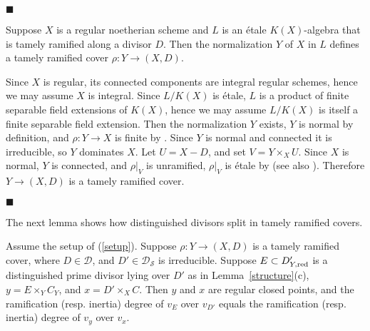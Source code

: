 \documentclass{amsart}
\theoremstyle{plain}
\theoremstyle{definition}
\theoremstyle{remark}
\numberwithin{equation}{section}%
\renewcommand{\S}{{\mathcal S}}
\renewcommand{\div}{{\text{\rm div}}}
\newcommand{\red}{{\text{\rm red}}}
\newcommand{\Pf}{{\noindent{\it Proof.}\;\;}}
\begin{document}



\hfill $\blacksquare$



\Lemma\label{covers}
Suppose $X$ is a regular noetherian scheme and
$L$ is an \'etale $K(X)$-algebra that is tamely ramified along a divisor $D$.
Then the normalization $Y$ of $X$ in $L$ defines a tamely ramified cover
$\rho:Y\to(X,D)$.
\rm

\Pf
Since $X$ is regular, its connected components are integral regular schemes, 
hence we may assume $X$ is integral.
Since $L/K(X)$ is \'etale, $L$ is a product of finite separable field extensions of $K(X)$,
hence we may assume $L/K(X)$ is itself a finite separable field extension.
Then the normalization $Y$ exists, $Y$ is normal by definition,
and $\rho:Y\to X$ is finite by \cite[4.1.25]{Liu}.
Since $Y$ is normal and connected it is irreducible, so $Y$ dominates $X$.
Let $U=X-D$, and set $V=Y\times_X U$.
Since $X$ is normal, $Y$ is connected, and $\rho|_V$ is unramified, 
$\rho|_V$ is \'etale by \cite[I.9.11]{SGA1} (see also \cite[I.3.20]{M}).
Therefore $Y\to (X,D)$ is a tamely ramified cover.

\hfill $\blacksquare$



The next lemma shows how distinguished divisors split in tamely ramified covers.

\Lemma\label{lemma2}
Assume the setup of (\ref{setup}).
Suppose $\rho:Y\to (X,D)$ is a tamely ramified cover, where $D\in\mathscr D$,
and $D'\in\mathscr D_\S$ is irreducible.
Suppose $E\subset D_{Y,\red}'$ is a distinguished prime divisor lying over $D'$ as in
Lemma~\ref{structure}(c),
$y= E\times_Y C_Y$, and $x=D'\times_X C$.
Then $y$ and $x$ are regular closed points,
and the ramification (resp. inertia) degree of $v_E$ over $v_{D'}$ 
equals the ramification (resp. inertia)
degree of $v_y$ over $v_x$.
\rm
\end{document}
